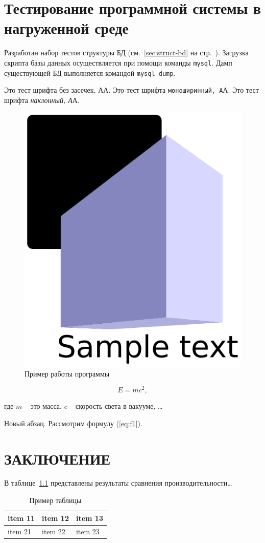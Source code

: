 \documentclass{studrep}
\begin{document}
\chapter{Тестирование программной системы в нагруженной среде}

Разработан набор тестов структуры БД (см.~\ref{sec:struct-bd} на стр.~\pageref{sec:struct-bd}).   Загрузка скрипта базы данных осуществляется при помощи команды \texttt{mysql}.  Дамп существующей БД выполняется командой \verb|mysql-dump|.

Это тест шрифта \textsf{без засечек, А}А.
Это тест шрифта \texttt{моноширинный, А}А.
Это тест шрифта \textit{наклонный, А}А.

\begin{figure}[hbtp]
  \centering
  \includegraphics[width=0.3\linewidth]{fig1.pdf}
  \caption{Пример работы программы}
  \label{fig:prog-ex}
\end{figure}


\begin{equation}
  \label{eq:f1}
  E=mc^2,
\end{equation}

\noindent{}где $m$ -- это масса, $c$ -- скорость света в вакууме, \ldots

Новый абзац. Рассмотрим формулу (\ref{eq:f1}).


\chapter*{ЗАКЛЮЧЕНИЕ}

В таблице~\ref{tbl:ex} представлены результаты сравнения производительности\ldots

\begin{table}[hb]
  \caption{Пример таблицы}\label{tbl:ex}
  \centering
\begin{tabularx}{1\textwidth} {
  | >{\raggedright\arraybackslash}X
  | >{\centering\arraybackslash}X
  | >{\raggedleft\arraybackslash}X | }
 \hline
 item 11 & item 12 & item 13 \\
 \hline
 item 21  & item 22  & item 23  \\
\hline
\end{tabularx}
\end{table}
\end{document}
